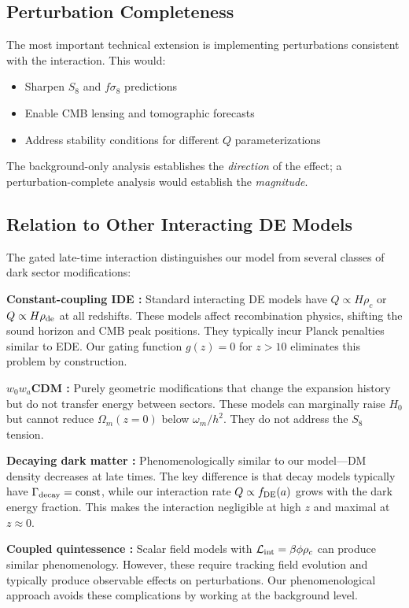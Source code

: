\documentclass[twocolumn,showpacs,preprintnumbers,amsmath,amssymb,prd]{revtex4-2}
\begin{document}
\subsection{Perturbation Completeness}

The most important technical extension is implementing perturbations consistent with the interaction. This would:
\begin{itemize}
    \item Sharpen $S_8$ and $f\sigma_8$ predictions
    \item Enable CMB lensing and tomographic forecasts
    \item Address stability conditions for different $Q$ parameterizations
\end{itemize}

The background-only analysis establishes the \textit{direction} of the effect; a perturbation-complete analysis would establish the \textit{magnitude}.

\subsection{Relation to Other Interacting DE Models}

The gated late-time interaction distinguishes our model from several classes of dark sector modifications:

\textbf{Constant-coupling IDE \cite{DiValentino2020}:} Standard interacting DE models have $Q \propto H\rho_c$ or $Q \propto H\rho_{\rm de}$ at all redshifts. These models affect recombination physics, shifting the sound horizon and CMB peak positions. They typically incur Planck penalties similar to EDE. Our gating function $g(z) = 0$ for $z > 10$ eliminates this problem by construction.

\textbf{$w_0w_a$CDM \cite{Chevallier2001}:} Purely geometric modifications that change the expansion history but do not transfer energy between sectors. These models can marginally raise $H_0$ but cannot reduce $\Omega_m(z=0)$ below $\omega_m/h^2$. They do not address the $S_8$ tension.

\textbf{Decaying dark matter \cite{Blackadder2014}:} Phenomenologically similar to our model---DM density decreases at late times. The key difference is that decay models typically have $\Gamma_{\rm decay} = \text{const}$, while our interaction rate $Q \propto f_{\rm DE}(a)$ grows with the dark energy fraction. This makes the interaction negligible at high $z$ and maximal at $z \approx 0$.

\textbf{Coupled quintessence \cite{Amendola2000}:} Scalar field models with $\mathcal{L}_{\rm int} = \beta \phi \rho_c$ can produce similar phenomenology. However, these require tracking field evolution and typically produce observable effects on perturbations. Our phenomenological approach avoids these complications by working at the background level.
\end{document}
